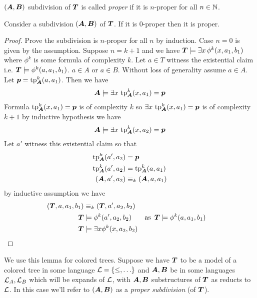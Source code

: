 \documentclass{amsart}
\DeclareMathOperator{\TT}{\boldface T}
\DeclareMathOperator{\A}{\boldface A}
\DeclareMathOperator{\B}{\boldface B}
\begin{document}
\begin{Definition}
	$(\A, \B)$ subdivision of $\TT$ is called \emph{proper} if it is $n$-proper for all $n \in \mathbb{N}$.
\end{Definition}

\begin{Lemma} \label{lm_subdivision}
	Consider a subdivision $(\A, \B)$ of $\TT$. If it is $0$-proper then it is proper.
\end{Lemma}

\begin{proof}
	Prove the subdivision is $n$-proper for all $n$ by induction. Case $n = 0$ is given by the assumption. Suppose $n = k + 1$ and we have $\TT \models \exists x \, \phi^k(x, a_1, b_1)$ where $\phi^k$ is some formula of complexity $k$. Let $a \in T$ witness the existential claim i.e. $\TT \models \phi^k(a, a_1, b_1)$. $a \in A$ or $a \in B$. Without loss of generality assume $a \in A$. Let $\pp = \tp^k_{\A} (a, a_1)$. Then we have 
	\begin{align*}
		\A \models \exists x \, \tp^k_{\A}(x, a_1) = \pp
	\end{align*}
	Formula $\tp^k_{\A}(x, a_1) = \pp$ is of complexity $k$ so $\exists x \, \tp^k_{\A}(x, a_1) = \pp$ is of complexity $k+1$ by inductive hypothesis we have
	\begin{align*}
		\A \models \exists x \, \tp^k_{\A}(x, a_2) = \pp
	\end{align*}
	Let $a'$ witness this existential claim so that  
	\begin{align*}
		\tp^k_{\A}(a', a_2) &= \pp \\
		\tp^k_{\A}(a', a_2) &= \tp^k_{\A}(a, a_1) \\
		(\A, a', a_2) &\equiv_k (\A, a, a_1)
	\end{align*}
	by inductive assumption we have
	\begin{align*}
		(\TT, a, a_1, b_1) &\equiv_k (\TT, a', a_2, b_2) \\
		\TT &\models \phi^k(a', a_2, b_2) & \text {as } \TT &\models \phi^k(a, a_1, b_1)\\
		\TT &\models \exists x \phi^k(x, a_2, b_2)
	\end{align*}
\end{proof}

We use this lemma for colored trees. Suppose we have $\TT$ to be a model of a colored tree in some language $\mathcal L = \{\leq, \ldots\}$ and $\A, \B$ be in some languages $\mathcal L_A, \mathcal L_B$ which will be expands of $\mathcal L$, with $\A, \B$ substructures of $\TT$ as reducts to $\mathcal L$. In this case we'll refer to $(\A, \B)$ as a \emph{proper subdivision} (of $\TT$).
\end{document}
